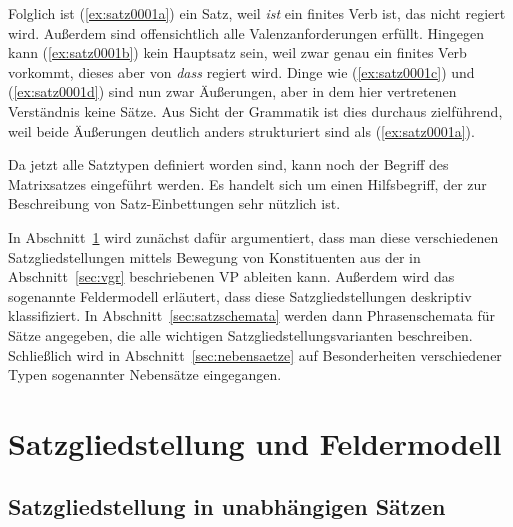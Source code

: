 Folglich ist (\ref{ex:satz0001a}) ein Satz, weil \textit{ist} ein finites Verb ist, das nicht regiert wird.
Außerdem sind offensichtlich alle Valenzanforderungen erfüllt.
Hingegen kann (\ref{ex:satz0001b}) kein Hauptsatz sein, weil zwar genau ein finites Verb vorkommt, dieses aber von \textit{dass} regiert wird.
Dinge wie (\ref{ex:satz0001c}) und (\ref{ex:satz0001d}) sind nun zwar Äußerungen, aber in dem hier vertretenen Verständnis keine Sätze.
Aus Sicht der Grammatik ist dies durchaus zielführend, weil beide Äußerungen deutlich anders strukturiert sind als (\ref{ex:satz0001a}).

\begin{exe}
  \ex\label{ex:satz0001} 
  \begin{xlist}
  \end{xlist}
\end{exe}

Da jetzt alle Satztypen definiert worden sind, kann noch der Begriff des Matrixsatzes eingeführt werden.
Es handelt sich um einen Hilfsbegriff, der zur Beschreibung von Satz-Einbettungen sehr nützlich ist.


In Abschnitt~\ref{sec:felder} wird zunächst dafür argumentiert, dass man diese verschiedenen Satzgliedstellungen mittels Bewegung von Konstituenten aus der in Abschnitt~\ref{sec:vgr} beschriebenen VP ableiten kann.
Außerdem wird das sogenannte Feldermodell erläutert, dass diese Satzgliedstellungen deskriptiv klassifiziert.
In Abschnitt~\ref{sec:satzschemata} werden dann Phrasenschemata für Sätze angegeben, die alle wichtigen Satzgliedstellungsvarianten beschreiben.
Schließlich wird in Abschnitt~\ref{sec:nebensaetze} auf Besonderheiten verschiedener Typen sogenannter Nebensätze eingegangen.

\section{Satzgliedstellung und Feldermodell}

\label{sec:felder}

\subsection{Satzgliedstellung in unabhängigen Sätzen}

